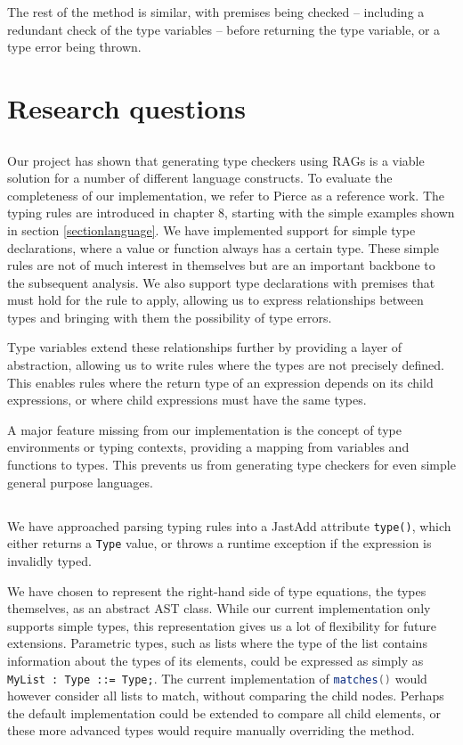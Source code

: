\documentclass[nofilelist]{cslthse-msc}
\begin{document}
The rest of the method is similar, with premises being checked -- including a redundant check of the type variables -- before returning the type variable, or a type error being thrown.

\section{Research questions}
\subsection{\rqone}
Our project has shown that generating type checkers using RAGs is a viable solution for a number of different language constructs.
To evaluate the completeness of our implementation, we refer to Pierce\cite{Pierce} as a reference work.
The typing rules are introduced in chapter 8, starting with the simple examples shown in section \ref{sectionlanguage}.
We have implemented support for simple type declarations, where a value or function always has a certain type.
These simple rules are not of much interest in themselves but are an important backbone to the subsequent analysis.
We also support type declarations with premises that must hold for the rule to apply, allowing us to express relationships between types and bringing with them the possibility of type errors.

Type variables extend these relationships further by providing a layer of abstraction, allowing us to write rules where the types are not precisely defined.
This enables rules where the return type of an expression depends on its child expressions, or where child expressions must have the same types.

A major feature missing from our implementation is the concept of type environments or typing contexts, providing a mapping from variables and functions to types.
This prevents us from generating type checkers for even simple general purpose languages.

\subsection{\rqtwo}
We have approached parsing typing rules into a JastAdd attribute \verb|type()|, which either returns a \verb|Type| value, or throws a runtime exception if the expression is invalidly typed.

We have chosen to represent the right-hand side of type equations, the types themselves, as an abstract AST class.
While our current implementation only supports simple types, this representation gives us a lot of flexibility for future extensions.
Parametric types, such as lists where the type of the list contains information about the types of its elements, could be expressed as simply as \lstinline{MyList : Type ::= Type;}.
The current implementation of \lstinline[language=java]{matches()} would however consider all lists to match, without comparing the child nodes.
Perhaps the default implementation could be extended to compare all child elements, or these more advanced types would require manually overriding the method.
\end{document}
